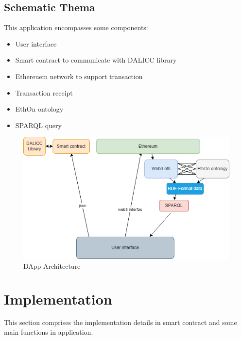 \subsection{Schematic Thema}
This application encompasses some components:
\begin{itemize}
	\item User interface
	\item Smart contract to communicate with DALICC library
	\item Ethereuem network to support transaction
	\item Transaction receipt
	\item EthOn ontology
	\item SPARQL query    
\end{itemize} 

\begin{center}
	
	\begin{figure}[htb!]
		
		\begin{minipage}{0.75\linewidth}
			
			\includegraphics[width=1.5\textwidth]{images/chap03_eth_dalicc_comm.png}
		\end{minipage}
		\caption{DApp Architecture}
		
	\end{figure}
	
\end{center}

\section{Implementation}
This section comprises the implementation details in smart contract and some main functions in application.

